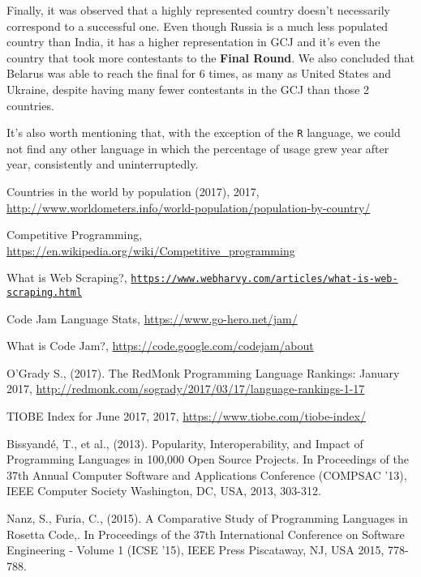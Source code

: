 \documentclass{article}
\begin{document}
\begin{multicols*}{2}
Finally, it was observed that a highly represented country doesn't necessarily correspond to a successful one. Even though Russia is a much less populated country than India, it has a higher representation in GCJ and it's even the country that took more contestants to the \textbf{Final Round}. We also concluded that Belarus was able to reach the final for 6 times, as many as United States and Ukraine, despite having many fewer contestants in the GCJ than those 2 countries.

It's also worth mentioning that, with the exception of the \texttt{R} language, we could not find any other language in which the percentage of usage grew year after year, consistently and uninterruptedly.

\begin{thebibliography}{1}

\raggedright
Countries in the world by population (2017), 2017, \url{http://www.worldometers.info/world-population/population-by-country/}

\raggedright Competitive Programming, \url{https://en.wikipedia.org/wiki/Competitive_programming}


\raggedright What is Web Scraping?, \texttt{\url{https://www.webharvy.com/articles/what-is-web-scraping.html}}

\raggedright Code Jam Language Stats, \url{https://www.go-hero.net/jam/}

\raggedright What is Code Jam?, \url{https://code.google.com/codejam/about}

\raggedright
O'Grady S., (2017). The RedMonk Programming Language Rankings: January 2017, \url{http://redmonk.com/sogrady/2017/03/17/language-rankings-1-17}


\raggedright TIOBE Index for June 2017, 2017, \url{https://www.tiobe.com/tiobe-index/}

\raggedright Bissyandé, T., et al., (2013). Popularity, Interoperability, and Impact of Programming Languages
in 100,000 Open Source Projects. In Proceedings of the 37th Annual Computer Software and Applications Conference (COMPSAC '13), IEEE Computer Society Washington, DC, USA, 2013, 303-312.

\raggedright Nanz, S., Furia, C., (2015). A Comparative Study of Programming Languages in Rosetta Code,. In Proceedings of the 37th International Conference on Software Engineering - Volume 1 (ICSE '15), IEEE Press Piscataway, NJ, USA  2015, 778-788.

\end{thebibliography}

\end{multicols*}
\end{document}
